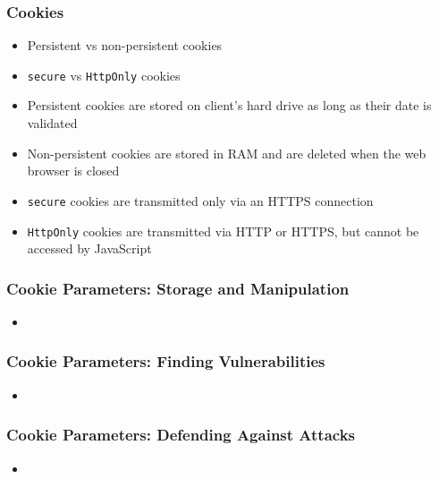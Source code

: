 \begin{frame}[fragile]
    \frametitle{Cookies}
    \begin{itemize}
        \item Persistent vs non-persistent cookies
        \item \verb|secure| vs \verb|HttpOnly| cookies
        \item Persistent cookies are stored on client's hard drive as long as their date is validated
        \item Non-persistent cookies are stored in RAM and are deleted when the web browser is closed
        \item \verb|secure| cookies are transmitted only via an HTTPS connection
        \item \verb|HttpOnly| cookies are transmitted via HTTP or HTTPS, but cannot be accessed by JavaScript
    \end{itemize}
\end{frame}

\begin{frame}
    \frametitle{Cookie Parameters: Storage and Manipulation}
    \begin{itemize}
        \item 
    \end{itemize}
\end{frame}

\begin{frame}
    \frametitle{Cookie Parameters: Finding Vulnerabilities}
    \begin{itemize}
        \item 
    \end{itemize}
\end{frame}

\begin{frame}
    \frametitle{Cookie Parameters: Defending Against Attacks}
    \begin{itemize}
        \item 
    \end{itemize}
\end{frame}